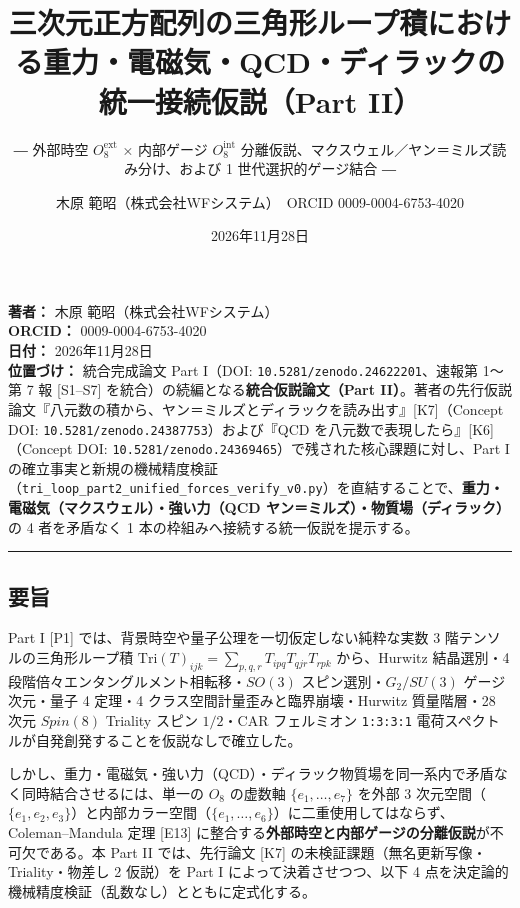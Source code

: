 \documentclass[
  a4paper,
]{ltjsarticle}
\title{三次元正方配列の三角形ループ積における重力・電磁気・QCD・ディラックの統一接続仮説（Part
II）}
\subtitle{― 外部時空 \(O_8^{\mathrm{ext}}\) × 内部ゲージ
\(O_8^{\mathrm{int}}\)
分離仮説、マクスウェル／ヤン＝ミルズ読み分け、および 1
世代選択的ゲージ結合 ―}
\author{木原 範昭（株式会社WFシステム）　ORCID 0009-0004-6753-4020}
\date{2026年11月28日}
\begin{document}
\maketitle

{
\setcounter{tocdepth}{2}
\tableofcontents
}
\textbf{著者：} 木原 範昭（株式会社WFシステム）\\
\textbf{ORCID：} 0009-0004-6753-4020\\
\textbf{日付：} 2026年11月28日\\
\textbf{位置づけ：} 統合完成論文 Part I（DOI:
\texttt{10.5281/zenodo.24622201}、速報第 1〜第 7 報 {[}S1--S7{]}
を統合）の続編となる\textbf{統合仮説論文（Part
II）}。著者の先行仮説論文『八元数の積から、ヤン＝ミルズとディラックを読み出す』{[}K7{]}（Concept
DOI: \texttt{10.5281/zenodo.24387753}）および『QCD
を八元数で表現したら』{[}K6{]}（Concept DOI:
\texttt{10.5281/zenodo.24369465}）で残された核心課題に対し、Part I
の確立事実と新規の機械精度検証（\texttt{tri\_loop\_part2\_unified\_forces\_verify\_v0.py}）を直結することで、\textbf{重力・電磁気（マクスウェル）・強い力（QCD
ヤン＝ミルズ）・物質場（ディラック）}の 4 者を矛盾なく 1
本の枠組みへ接続する統一仮説を提示する。

\begin{center}\rule{0.5\linewidth}{0.5pt}\end{center}

\subsection{要旨}\label{ux8981ux65e8}

Part I {[}P1{]} では、背景時空や量子公理を一切仮定しない純粋な実数 3
階テンソルの三角形ループ積
\(\mathrm{Tri}(T)_{ijk} = \sum_{p,q,r} T_{ipq} T_{qjr} T_{rpk}\)
から、Hurwitz 結晶選別・4 段階倍々エンタングルメント相転移・\(SO(3)\)
スピン選別・\(G_2/SU(3)\) ゲージ次元・量子 4 定理・4
クラス空間計量歪みと臨界崩壊・Hurwitz 質量階層・28 次元 \(Spin(8)\)
Triality スピン \(1/2\)・CAR フェルミオン \texttt{1:3:3:1}
電荷スペクトルが自発創発することを仮説なしで確立した。

しかし、重力・電磁気・強い力（QCD）・ディラック物質場を同一系内で矛盾なく同時結合させるには、単一の
\(O_8\) の虚数軸 \(\{e_1, \dots, e_7\}\) を外部 3
次元空間（\(\{e_1, e_2, e_3\}\)）と内部カラー空間（\(\{e_1, \dots, e_6\}\)）に二重使用してはならず、Coleman--Mandula
定理 {[}E13{]}
に整合する\textbf{外部時空と内部ゲージの分離仮説}が不可欠である。本 Part
II では、先行論文 {[}K7{]} の未検証課題（無名更新写像・Triality・物差し
2 仮説）を Part I によって決着させつつ、以下 4
点を決定論的機械精度検証（乱数なし）とともに定式化する。
\end{document}
